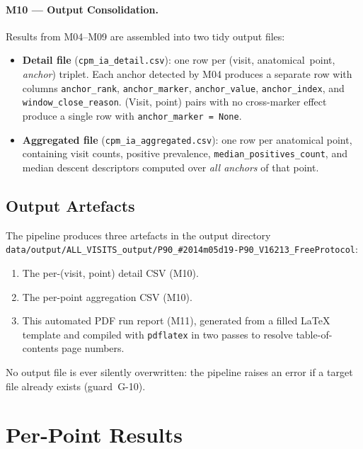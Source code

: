 \documentclass[a4paper,11pt]{article}
\begin{document}
\paragraph{M10 --- Output Consolidation.}
Results from M04--M09 are assembled into two tidy output files:
\begin{itemize}
  \item \textbf{Detail file} (\texttt{cpm\_ia\_detail.csv}): one row per
        (visit, anatomical~point, \emph{anchor}) triplet. Each anchor detected by M04
        produces a separate row with columns \texttt{anchor\_rank},
        \texttt{anchor\_marker}, \texttt{anchor\_value}, \texttt{anchor\_index},
        and \texttt{window\_close\_reason}.
        (Visit, point) pairs with no cross-marker effect produce a single row with
        \texttt{anchor\_marker = None}.
  \item \textbf{Aggregated file} (\texttt{cpm\_ia\_aggregated.csv}): one row per
        anatomical point, containing visit counts, positive prevalence,
        \texttt{median\_positives\_count}, and median descent descriptors computed over
        \emph{all anchors} of that point.
\end{itemize}

\subsection{Output Artefacts}

The pipeline produces three artefacts in the output directory \texttt{data/output/ALL\_VISITS\_output/P90\_\#2014m05d19-P90\_V16213\_FreeProtocol}:
\begin{enumerate}
  \item The per-(visit, point) detail CSV (M10).
  \item The per-point aggregation CSV (M10).
  \item This automated PDF run report (M11), generated from a filled \LaTeX{} template
        and compiled with \texttt{pdflatex} in two passes to resolve table-of-contents
        page numbers.
\end{enumerate}
No output file is ever silently overwritten: the pipeline raises an error if a target
file already exists (guard~G-10).

\section{Per-Point Results}
\end{document}

